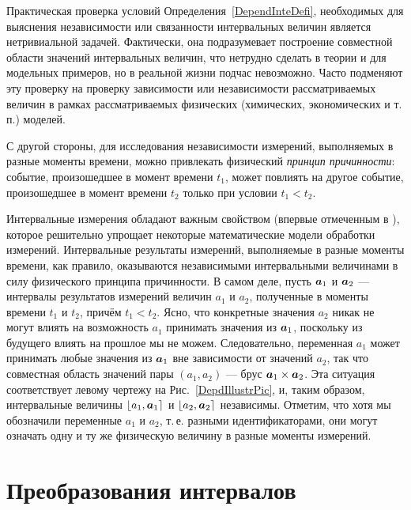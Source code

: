\documentclass[a5paper,openany]{book}
\newcommand{\mbf}[1]{\protect\text{\boldmath$#1$}}
\begin{document}
Практическая проверка условий Определения~\ref{DependInteDefi}, необходимых 
для выяснения независимости или связанности интервальных величин является 
нетривиальной задачей. Фактически, она подразумевает построение совместной области 
значений интервальных величин, что нетрудно сделать в теории и для модельных 
примеров, но в реальной жизни подчас невозможно. Часто подменяют эту проверку 
на проверку зависимости или независимости рассматриваемых величин в рамках 
рассматриваемых физических (химических, экономических и т.\,п.) моделей. 
  
С другой стороны, для исследования независимости измерений, выполняемых в разные 
моменты времени, можно привлекать физический \emph{принцип причинности}: событие, 
произошедшее в момент времени $t_1$, может повлиять на другое событие, произошедшее 
в момент времени $t_2$ только при условии $t_{1} < t_{2}$. 
  
Интервальные измерения обладают важным свойством (впервые отмеченным 
в \cite{SSharyBook}), которое решительно упрощает некоторые математические модели 
обработки измерений. Интервальные результаты измерений, выполняемые в разные моменты 
времени, как правило, оказываются независимыми интервальными величинами в силу 
физического принципа причинности. В самом деле, пусть $\mbf{a}_1$ и $\mbf{a}_2$ 
--- интервалы результатов измерений величин $a_1$ и $a_2$, полученные в моменты 
времени $t_1$ и $t_2$, причём $t_{1} < t_{2}$. Ясно, что конкретные значения $a_2$ 
никак не могут влиять на возможность $a_1$ принимать значения из $\mbf{a}_1$, 
поскольку из будущего влиять на прошлое мы не можем. Следовательно, переменная $a_1$ 
может принимать любые значения из $\mbf{a}_1$ вне зависимости от значений $a_2$, 
так что совместная область значений пары $(a_{1}, a_{2})$ --- брус $\mbf{a}_{1}\times
\mbf{a}_{2}$. Эта ситуация соответствует левому чертежу на Рис.~\ref{DepdIllustrPic}, 
и, таким образом, интервальные величины $\lfloor a_{1}, \mbf{a}_{1} \rceil$ и 
$\lfloor a_{2}, \mbf{a}_{2}\rceil$ независимы. Отметим, что хотя мы обозначили 
переменные $a_1$ и $a_2$, т.\,е. разными идентификаторами, они могут означать 
одну и ту же физическую величину в разные моменты измерений.  
  
  
  
\section{Преобразования интервалов} 
\label{TransfInteSect}
  
\end{document}
